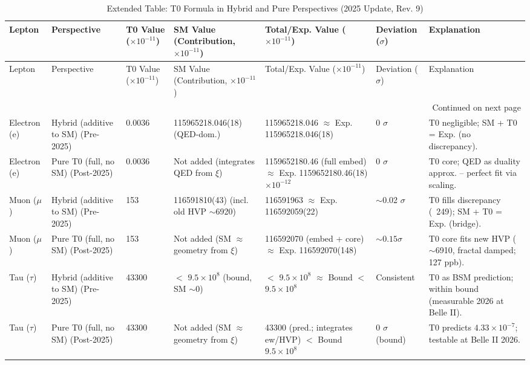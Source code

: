 \documentclass[12pt,a4paper]{article}
\theoremstyle{definition}
\begin{document}
	\begin{longtable}{@{}p{1.5cm}p{2cm}p{1.4cm}p{3cm}p{3cm}p{1.5cm}p{2.5cm}@{}}
		\caption{Extended Table: T0 Formula in Hybrid and Pure Perspectives (2025 Update, Rev. 9)} \label{tab:extended_comparison}\\
		\toprule
		Lepton & Perspective & T0 Value ($ \times 10^{-11}$) & SM Value (Contribution, $ \times 10^{-11}$) & Total/Exp. Value ($ \times 10^{-11}$) & Deviation ($\sigma$) & Explanation \\
		\midrule
		\endfirsthead
		
		\toprule
		Lepton & Perspective & T0 Value ($ \times 10^{-11}$) & SM Value (Contribution, $ \times 10^{-11}$) & Total/Exp. Value ($ \times 10^{-11}$) & Deviation ($\sigma$) & Explanation \\
		\midrule
		\endhead
		
		\bottomrule
		\multicolumn{7}{r}{Continued on next page} \\
		\endfoot
		
		Electron (e) & Hybrid (additive to SM) (Pre-2025) & 0.0036 & 115965218.046(18) (QED-dom.) & 115965218.046 $\approx$ Exp. 115965218.046(18) & 0 $\sigma$ & T0 negligible; SM + T0 = Exp. (no discrepancy). \\
		Electron (e) & Pure T0 (full, no SM) (Post-2025) & 0.0036 & Not added (integrates QED from $\xi$) & 1159652180.46 (full embed) $\approx$ Exp. 1159652180.46(18) $\times 10^{-12}$ & 0 $\sigma$ & T0 core; QED as duality approx. -- perfect fit via scaling. \\
		Muon ($\mu$) & Hybrid (additive to SM) (Pre-2025) & 153 & 116591810(43) (incl. old HVP $\sim$6920) & 116591963 $\approx$ Exp. 116592059(22) & $\sim$0.02 $\sigma$ & T0 fills discrepancy (~249); SM + T0 = Exp. (bridge). \\
		Muon ($\mu$) & Pure T0 (full, no SM) (Post-2025) & 153 & Not added (SM $\approx$ geometry from $\xi$) & 116592070 (embed + core) $\approx$ Exp. 116592070(148) & $\sim 0.15 \sigma$ & T0 core fits new HVP ($\sim$6910, fractal damped; 127 ppb). \\
		Tau ($\tau$) & Hybrid (additive to SM) (Pre-2025) & 43300 & $<$ $9.5 \times 10^{8}$ (bound, SM $\sim$0) & $<$ $9.5 \times 10^{8}$ $\approx$ Bound $<$ $9.5 \times 10^{8}$ & Consistent & T0 as BSM prediction; within bound (measurable 2026 at Belle II). \\
		Tau ($\tau$) & Pure T0 (full, no SM) (Post-2025) & 43300 & Not added (SM $\approx$ geometry from $\xi$) & 43300 (pred.; integrates ew/HVP) $<$ Bound $9.5 \times 10^{8}$ & 0 $\sigma$ (bound) & T0 predicts $4.33 \times 10^{-7}$; testable at Belle II 2026. \\
	\end{longtable}
	
\end{document}
